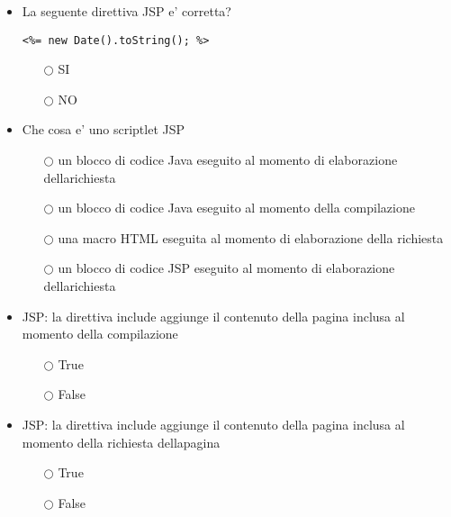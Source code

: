\documentclass[10pt,twocolumn]{article}
\begin{document}
\begin{itemize}
    \item La seguente direttiva JSP e' corretta?
          \begin{verbatim}
<%= new Date().toString(); %>
\end{verbatim}
          \begin{itemize}
              \item[$\bigcirc$] SI
              \item[$\bigcirc$] NO
          \end{itemize}
\end{itemize}
\begin{itemize}
    \item Che cosa e' uno scriptlet JSP
          \begin{itemize}
              \item[$\bigcirc$] un blocco di codice Java eseguito al momento di elaborazione dellarichiesta
              \item[$\bigcirc$] un blocco di codice Java eseguito al momento della compilazione
              \item[$\bigcirc$] una macro HTML eseguita al momento di elaborazione della richiesta
              \item[$\bigcirc$] un blocco di codice JSP eseguito al momento di elaborazione dellarichiesta
          \end{itemize}
\end{itemize}
\begin{itemize}
    \item JSP: la direttiva include aggiunge il contenuto della pagina inclusa al momento della compilazione
          \begin{itemize}
              \item[$\bigcirc$] True
              \item[$\bigcirc$] False
          \end{itemize}
\end{itemize}
\begin{itemize}
    \item JSP: la direttiva include aggiunge il contenuto della pagina inclusa al momento della richiesta dellapagina
          \begin{itemize}
              \item[$\bigcirc$] True
              \item[$\bigcirc$] False
          \end{itemize}
\end{itemize}
\end{document}
